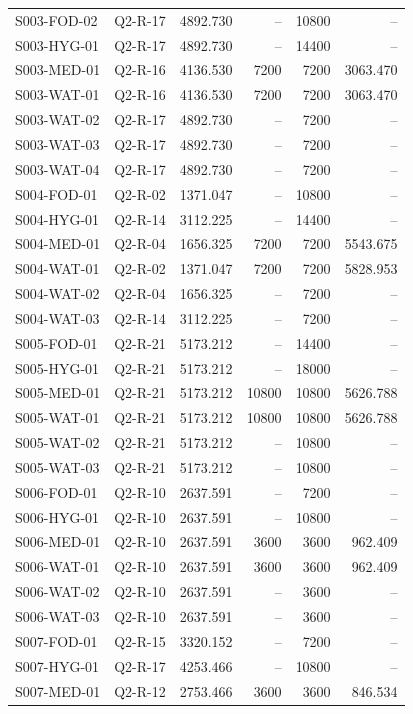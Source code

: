 \begin{longtable}{@{}llrrrr@{}}
S003-FOD-02 & Q2-R-17 & 4892.730 & -- & 10800 & --\\
S003-HYG-01 & Q2-R-17 & 4892.730 & -- & 14400 & --\\
S003-MED-01 & Q2-R-16 & 4136.530 & 7200 & 7200 & 3063.470\\
S003-WAT-01 & Q2-R-16 & 4136.530 & 7200 & 7200 & 3063.470\\
S003-WAT-02 & Q2-R-17 & 4892.730 & -- & 7200 & --\\
S003-WAT-03 & Q2-R-17 & 4892.730 & -- & 7200 & --\\
S003-WAT-04 & Q2-R-17 & 4892.730 & -- & 7200 & --\\
S004-FOD-01 & Q2-R-02 & 1371.047 & -- & 10800 & --\\
S004-HYG-01 & Q2-R-14 & 3112.225 & -- & 14400 & --\\
S004-MED-01 & Q2-R-04 & 1656.325 & 7200 & 7200 & 5543.675\\
S004-WAT-01 & Q2-R-02 & 1371.047 & 7200 & 7200 & 5828.953\\
S004-WAT-02 & Q2-R-04 & 1656.325 & -- & 7200 & --\\
S004-WAT-03 & Q2-R-14 & 3112.225 & -- & 7200 & --\\
S005-FOD-01 & Q2-R-21 & 5173.212 & -- & 14400 & --\\
S005-HYG-01 & Q2-R-21 & 5173.212 & -- & 18000 & --\\
S005-MED-01 & Q2-R-21 & 5173.212 & 10800 & 10800 & 5626.788\\
S005-WAT-01 & Q2-R-21 & 5173.212 & 10800 & 10800 & 5626.788\\
S005-WAT-02 & Q2-R-21 & 5173.212 & -- & 10800 & --\\
S005-WAT-03 & Q2-R-21 & 5173.212 & -- & 10800 & --\\
S006-FOD-01 & Q2-R-10 & 2637.591 & -- & 7200 & --\\
S006-HYG-01 & Q2-R-10 & 2637.591 & -- & 10800 & --\\
S006-MED-01 & Q2-R-10 & 2637.591 & 3600 & 3600 & 962.409\\
S006-WAT-01 & Q2-R-10 & 2637.591 & 3600 & 3600 & 962.409\\
S006-WAT-02 & Q2-R-10 & 2637.591 & -- & 3600 & --\\
S006-WAT-03 & Q2-R-10 & 2637.591 & -- & 3600 & --\\
S007-FOD-01 & Q2-R-15 & 3320.152 & -- & 7200 & --\\
S007-HYG-01 & Q2-R-17 & 4253.466 & -- & 10800 & --\\
S007-MED-01 & Q2-R-12 & 2753.466 & 3600 & 3600 & 846.534\\

\end{longtable}
